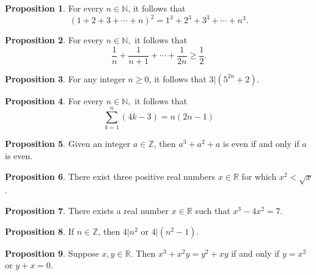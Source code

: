 \documentclass[11pt]{article}
\theoremstyle{definition}
\theoremstyle{theorem}
\newtheorem{proposition}{Proposition}
\begin{document}
\begin{proposition}%
  For every $n\in\mathbb{N}$, it follows that
  \begin{equation*}
    (1+2+3+\dotsb+n)^2 = 1^3 + 2^3 + 3^3 + \dotsb + n^3.
  \end{equation*}
\end{proposition}

\begin{proposition}%
  For every $n \in \mathbb{N},$ it follows that 
  \begin{equation*}
    \frac{1}{n} + \frac{1}{n+1} + \dotsb + \frac{1}{2n} \geq \frac{1}{2}.
  \end{equation*}
\end{proposition}

\begin{proposition}%
  For any integer $n \geq 0$, it follows that $3 \vert (5^{2n}+2).$
\end{proposition}

\begin{proposition}%
  For every $n \in \mathbb{N},$ it follows that
  \begin{equation*}
    \sum_{k=1}^n (4k-3) = n(2n-1)
  \end{equation*}
\end{proposition}

\begin{proposition}%
  Given an integer $a \in \mathbb{Z}$, then $a^3+a^2+a$ is even if and only if $a$ is even.
\end{proposition}

\begin{proposition}%
  There exist three positive real numbers $x \in \mathbb{R}$ for which $x^2 < \sqrt{x}$.
\end{proposition}

\begin{proposition}%
  There exists a real number $x \in \mathbb{R}$ such that $x^3-4x^2=7.$
\end{proposition}

\begin{proposition}%
  If $n \in \mathbb{Z}$, then $4 \vert n^2$ or $4 \vert (n^2-1).$
\end{proposition}

\begin{proposition}%
  Suppose $x,y \in \mathbb{R}.$  Then $x^3+x^2y=y^2+xy$ if and only if $y=x^2$ or $y+x=0$.
\end{proposition}
\end{document}
